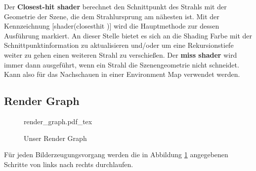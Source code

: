 Der \textbf{Closest-hit shader} berechnet den Schnittpunkt des Strahls mit der Geometrie
der Szene, die dem Strahlursprung am nähesten ist.
Mit der Kennzeichnung [shader(\dq closesthit \dq)] wird die Hauptmethode zur 
dessen Ausführung markiert. An dieser Stelle bietet es sich an die Shading Farbe 
mit der Schnittpunktinformation zu aktualisieren und/oder um eine Rekursionstiefe weiter 
zu gehen einen weiteren Strahl zu verschießen. 
Der \textbf{miss shader} wird immer dann ausgeführt, wenn ein Strahl die
Szenengeometrie nicht schneidet. Kann also für das Nachschauen in einer 
Environment Map verwendet werden. 

\subsection{Render Graph}

\begin{figure}[H]
    \centering
    \def\svgwidth{\columnwidth}
    {render_graph.pdf_tex}
    \caption{Unser Render Graph}
    \label{pic:Render Graph}
\end{figure}

Für jeden Bilderzeugungsvorgang werden die in Abbildung \ref{pic:Render Graph} angegebenen Schritte von links nach rechts 
durchlaufen.








